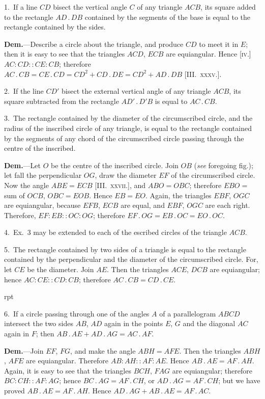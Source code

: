 \documentclass[oneside]{book}
\newcommand\imgflow[3]{
\setcounter{wrapwidth}{#1}
\begin{wrapfigure}[#2]{r}{\value{wrapwidth}pt}
\begin{center}
\vspace{-0.3in}
\end{center}
\end{wrapfigure}
}
\newcommand\imgcent[2]{
\begin{center}
\end{center}
}
\begin{document}
\begin{footnotesize}
1.~If a line $CD$ bisect the vertical angle $C$ of any triangle $ACB$,
its square added to the rectangle $AD\,.\,DB$
contained by the segments of the base is
equal to the rectangle contained by the
sides.

\textbf{Dem.}---Describe a circle about the triangle,
and produce $CD$ to meet it in $E$;
then it is easy to see that the triangles
$ACD$, $ECB$ are equiangular. Hence [\textsc{iv.}]
$AC:CD::CE:CB$; therefore $AC\,.\,CB
= CE\,.\,CD = CD^2 + CD\,.\,DE = CD^2 +
AD\,.\,DB$ [III\@.~\textsc{xxxv.}].

2.~If the line $CD'$ bisect the external vertical angle of any triangle
$ACB$, its square subtracted from the rectangle $AD'\,.\,D'B$
is equal to $AC\,.\,CB$.

3.~The rectangle contained by the diameter of the circumscribed
circle, and the radius of the inscribed circle of any triangle,
is equal to the rectangle contained by the segments of any
chord of the circumscribed circle passing through the centre of
the inscribed.

\textbf{Dem.}---Let $O$ be the centre of the inscribed circle. Join $OB$
(\emph{see} foregoing fig.); let fall the perpendicular $OG$, draw the diameter
$EF$ of the circumscribed circle. Now the angle $ABE = ECB$
[III\@.~\textsc{xxvii.}], and $ABO = OBC$; therefore $EBO =$ sum of $OCB$,
$OBC = EOB$. Hence $EB = EO$. Again, the triangles $EBF$, $OGC$
are equiangular, because $EFB$, $ECB$ are equal, and $EBF$, $OGC$
are each right. Therefore, $EF:EB::OC:OG$; therefore
$EF\,.\,OG = EB\,.\,OC = EO\,.\,OC$.

4.~Ex.~3 may be extended to each of the escribed circles of the
triangle $ACB$.

\imgcent{100}{f191}

5.~The rectangle contained by two sides of a triangle is equal
to the rectangle contained by the perpendicular
and the diameter of the circumscribed
circle. For, let $CE$ be the diameter.
Join $AE$. Then the triangles $ACE$, $DCB$
are equiangular; hence $AC:CE::CD:CB$;
therefore $AC\,.\,CB = CD\,.\,CE$.

\imgflow{115}{13}{f192}

6.~If a circle passing through one of
the angles $A$ of a parallelogram $ABCD$
intersect the two sides $AB$, $AD$ again in
the points $E$, $G$ and the diagonal $AC$ again in $F$; then $AB\,.\,AE
+ AD\,.\,AG = AC\,.\,AF$.


\textbf{Dem.}---Join $EF$, $FG$, and make the angle $ABH = AFE$. Then
the triangles $ABH$, $AFE$ are equiangular.
Therefore $AB : AH :: AF : AE$.
Hence $AB\,.\,AE = AF\,.\,AH$. Again, it
is easy to see that the triangles $BCH$,
$FAG$ are equiangular; therefore $BC : CH
:: AF : AG$; hence $BC\,.\,AG = AF\,.\,CH$,
or $AD\,.\,AG = AF\,.\,CH$; but we have
proved $AB\,.\,AE = AF\,.\,AH$. Hence
$AD\,.\,AG + AB\,.\,AE = AF\,.\,AC$.


\end{footnotesize}
\end{document}
